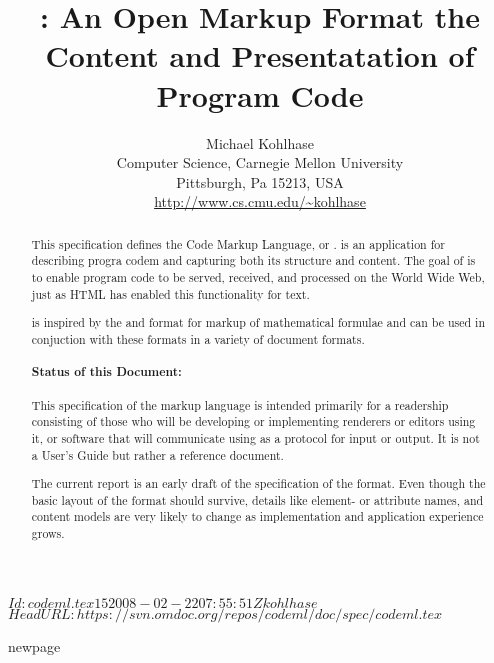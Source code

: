 \documentclass[11pt,twoside,titlepage]{report}
\title{{\codeml}: An Open Markup Format the Content and Presentatation of Program Code}
\author{Michael Kohlhase\\
  Computer Science, Carnegie Mellon University\\
  Pittsburgh, Pa 15213, USA\\
  {\url{http://www.cs.cmu.edu/~kohlhase}}}
\begin{document}
\svnInfo $Id: codeml.tex 15 2008-02-22 07:55:51Z kohlhase $
\svnKeyword $HeadURL: https://svn.omdoc.org/repos/codeml/doc/spec/codeml.tex $

\maketitle
\setcounter{page}{0}
\begin{abstract}
  This specification defines the Code Markup Language, or {\codeml}. {\codeml} is
  an {\xml} application for describing progra codem and capturing both its
  structure and content. The goal of {\codeml} is to enable program code to be
  served, received, and processed on the World Wide Web, just as HTML has enabled
  this functionality for text.
  
  {\codeml} is inspired by the {\mathml} and {\openmath} format for markup of
  mathematical formulae and can be used in conjuction with these formats in a
  variety of document formats.

  \paragraph{Status of this Document:} 

  This specification of the markup language {\codeml} is intended primarily for a
  readership consisting of those who will be developing or implementing renderers
  or editors using it, or software that will communicate using {\codeml} as a
  protocol for input or output. It is not a User's Guide but rather a reference
  document.
  
  The current report is an early draft of the specification of the {\codeml}
  format. Even though the basic layout of the format should survive, details like
  element- or attribute names, and content models are very likely to change as
  implementation and application experience grows.
\end{abstract}
\newpage
\setcounter{tocdepth}{2}\tableofcontents
newpage



\newpage 
 
 
\newpage
{\small}

\ednotemessage
\end{document}
